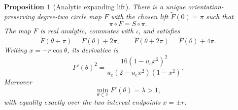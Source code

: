 \documentclass[11pt]{article}
\newtheorem{proposition}[theorem]{Proposition}
\theoremstyle{definition}
\theoremstyle{remark}
\newcommand{\T}{\mathbb T}
\newcommand{\uc}{u_{\mathrm c}}
\begin{document}
\begin{proposition}[Analytic expanding lift]
\label{prop:analytic-lift}
There is a unique orientation-preserving degree-two circle map $F$ with the
chosen lift $\widetilde F(0)=\pi$ such that
\begin{equation}\label{eq:semiconjugacy}
 \pi\circ F=S\circ\pi.
\end{equation}
The map $F$ is real analytic, commutes with $\iota$, and satisfies
\begin{equation}\label{eq:half-period}
 \widetilde F(\theta+\pi)=\widetilde F(\theta)+2\pi,
 \qquad
 \widetilde F(\theta+2\pi)=\widetilde F(\theta)+4\pi.
\end{equation}
Writing $x=-r\cos\theta$, its derivative is
\begin{equation}\label{eq:lift-derivative}
 \boxed{
 F'(\theta)^2=
 \frac{16(1-\uc x^2)^2}
 {\uc(2-\uc x^2)(1-x^2)}.}
\end{equation}
Moreover
\begin{equation}\label{eq:min-expansion}
 \min_{\theta\in\T}F'(\theta)=\lambda>1,
\end{equation}
with equality exactly over the two interval endpoints $x=\pm r$.
\end{proposition}
\end{document}

